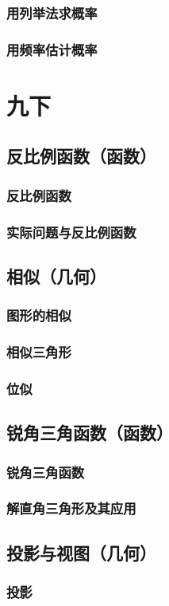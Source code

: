 \documentclass[cn,blue,10pt]{elegantbook}
\begin{document}
\section{用列举法求概率}
\section{用频率估计概率}
\part{九下}
\chapter{反比例函数（函数）}
\section{反比例函数}
\section{实际问题与反比例函数}
\chapter{相似（几何）}
\section{图形的相似}
\section{相似三角形}
\section{位似}
\chapter{锐角三角函数（函数）}
\section{锐角三角函数}
\section{解直角三角形及其应用}
\chapter{投影与视图（几何）}
\section{投影}
\end{document}

